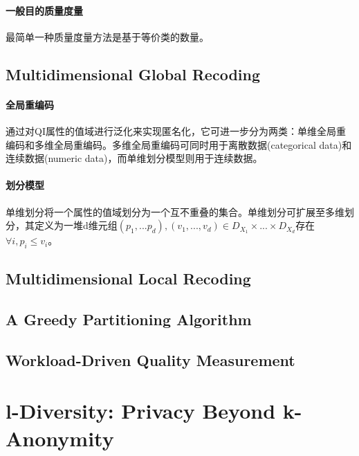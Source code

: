 \documentclass[12pt,a4paper]{article}
\begin{document}
\paragraph{一般目的质量度量} 最简单一种质量度量方法是基于等价类的数量。

\subsection{Multidimensional Global Recoding}
\paragraph{全局重编码} 通过对QI属性的值域进行泛化来实现匿名化，它可进一步分为两类：单维全局重编码和多维全局重编码。多维全局重编码可同时用于离散数据(categorical data)和连续数据(numeric data)，而单维划分模型则用于连续数据。
\paragraph{划分模型} 单维划分将一个属性的值域划分为一个互不重叠的集合。单维划分可扩展至多维划分，其定义为一堆d维元组$(p_1,...p_d),(v_1,...,v_d) \in D_{X_1} \times ... \times D_{X_d}$存在$ \forall i, p_i \leq v_i$。
\subsection{Multidimensional Local Recoding}

\subsection{A Greedy Partitioning Algorithm}

\subsection{Workload-Driven Quality Measurement}


























\section{l-Diversity: Privacy Beyond k-Anonymity\cite{l-diversity} }
\end{document}

